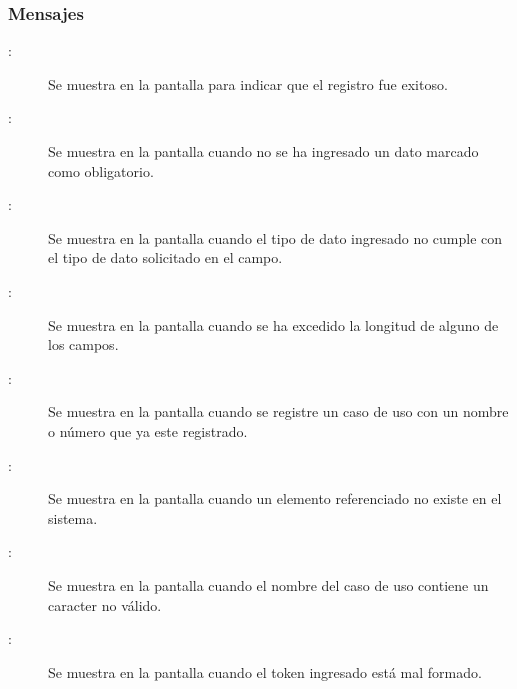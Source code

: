 \subsubsection{Mensajes}

	
\begin{description}
	\item[:] Se muestra en la pantalla  para indicar que el registro fue exitoso.
	\item[:] Se muestra en la pantalla  cuando no se ha ingresado un dato marcado como obligatorio.
	\item[:] Se muestra en la pantalla  cuando el tipo de dato ingresado no cumple con el tipo de dato solicitado en el campo.
	\item[:] Se muestra en la pantalla  cuando se ha excedido la longitud de alguno de los campos.
	\item[:] Se muestra en la pantalla  cuando se registre un caso de uso con un nombre o número que ya este registrado.
	\item[:] Se muestra en la pantalla  cuando un elemento referenciado no existe en el sistema.
	\item[:] Se muestra en la pantalla  cuando el nombre del caso de uso contiene un caracter no válido.
	\item[:] Se muestra en la pantalla  cuando el token ingresado está mal formado.
\end{description}
